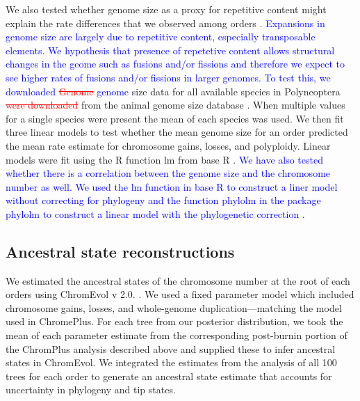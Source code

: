 \documentclass[]{rsos}%
\begin{document}
We also tested whether genome size as a proxy for repetitive content might explain the rate differences that we observed among orders \cite{kidwell2002transposable,bennetzen2005mechanisms}. 
\textcolor{blue}{Expansions in genome size are largely due to repetitive content, especially transposable elements.}
\textcolor{blue}{We hypothesis that presence of repetetive content allows structural changes in the geome such as fusions and/or fissions and therefore we expect to see higher rates of fusions and/or fissions in larger genomes.}
\textcolor{blue}{To test this, we downloaded }
\textcolor{red}{\st{Genome }} \textcolor{blue}{genome} size data for all available species in Polyneoptera \textcolor{red}{\st{were downloaded}} from the animal genome size database \cite{gregory2019}.
When multiple values for a single species were present the mean of each species was used.
We then fit three linear models to test whether the mean genome size for an order predicted the mean rate estimate for chromosome gains, losses, and polyploidy. 
Linear models were fit using the R function lm from base R \cite{R-citation}.
\textcolor{blue}{We have also tested whether there is a correlation between the genome size and the chromosome number as well.}
\textcolor{blue}{We used the lm function in base R to construct a liner model without correcting for phylogeny and the function phylolm in the package phylolm to construct a linear model with the phylogenetic correction \cite{R-citation, phylolm}.}

\subsection{Ancestral state reconstructions}
We estimated the ancestral states of the chromosome number at the root of each orders using ChromEvol v 2.0. \cite{glick2014chromevol, mayrose2009chromevol}.
We used a fixed parameter model which included chromosome gains, losses, and whole-genome duplication---matching the model used in ChromePlus.
For each tree from our posterior distribution, we took the mean of each parameter estimate from the corresponding post-burnin portion of the ChromPlus analysis described above and supplied these to infer ancestral states in ChromEvol.
We integrated the estimates from the analysis of all 100 trees for each order to generate an ancestral state estimate that accounts for uncertainty in phylogeny and tip states. 
\end{document}

